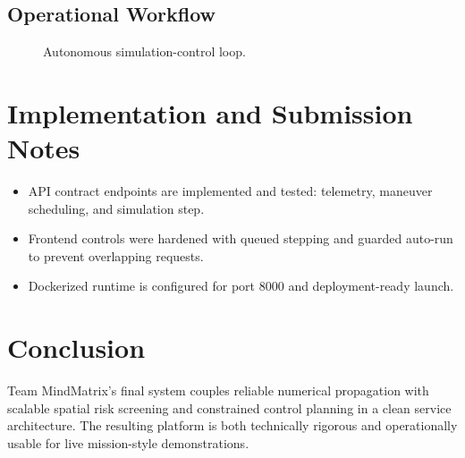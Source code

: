 \documentclass[11pt,a4paper]{article}
\begin{document}
\subsection{Operational Workflow}
\begin{figure}[h!]
\centering
{}
\caption{Autonomous simulation-control loop.}
\end{figure}

\section{Implementation and Submission Notes}
\begin{itemize}
  \item API contract endpoints are implemented and tested: telemetry, maneuver scheduling, and simulation step.
  \item Frontend controls were hardened with queued stepping and guarded auto-run to prevent overlapping requests.
  \item Dockerized runtime is configured for port 8000 and deployment-ready launch.
\end{itemize}

\section{Conclusion}
Team MindMatrix's final system couples reliable numerical propagation with scalable spatial risk screening and constrained control planning in a clean service architecture. The resulting platform is both technically rigorous and operationally usable for live mission-style demonstrations.
\end{document}
